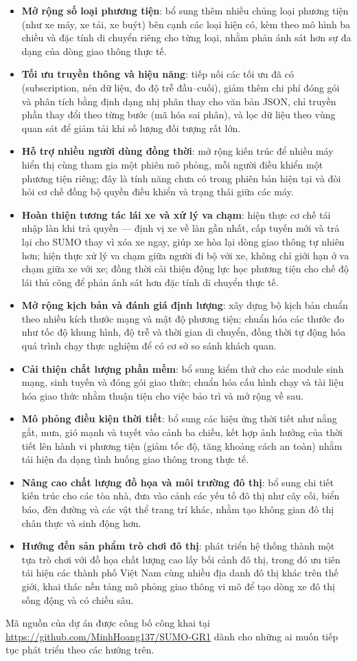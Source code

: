 \documentclass[../DoAn.tex]{subfiles}
\begin{document}
\begin{itemize}[leftmargin=2em]
	\item \textbf{Mở rộng số loại phương tiện}: bổ sung thêm nhiều chủng loại
	phương tiện (như xe máy, xe tải, xe buýt) bên cạnh các loại hiện có, kèm theo
	mô hình ba chiều và đặc tính di chuyển riêng cho từng loại, nhằm phản ánh sát
	hơn sự đa dạng của dòng giao thông thực tế.
	\item \textbf{Tối ưu truyền thông và hiệu năng}: tiếp nối các tối ưu đã có
	(subscription, nén dữ liệu, đo độ trễ đầu--cuối), giảm thêm chi phí đóng gói
	và phân tích bằng định dạng nhị phân thay cho văn bản \gls{JSON}, chỉ truyền
	phần thay đổi theo từng bước (mã hóa sai phân), và lọc dữ liệu theo vùng quan
	sát để giảm tải khi số lượng đối tượng rất lớn.
	\item \textbf{Hỗ trợ nhiều người dùng đồng thời}: mở rộng kiến trúc để nhiều
	máy hiển thị cùng tham gia một phiên mô phỏng, mỗi người điều khiển một phương
	tiện riêng; đây là tính năng chưa có trong phiên bản hiện tại và đòi hỏi cơ
	chế đồng bộ quyền điều khiển và trạng thái giữa các máy.
	\item \textbf{Hoàn thiện tương tác lái xe và xử lý va chạm}: hiện thực cơ
	chế tái nhập làn khi trả quyền --- định vị xe về làn gần nhất, cấp tuyến mới
	và trả lại cho \gls{SUMO} thay vì xóa xe ngay, giúp xe hòa lại dòng giao thông
	tự nhiên hơn; hiện thực xử lý va chạm giữa người đi bộ với xe, không chỉ giới
	hạn ở va chạm giữa xe với xe; đồng thời cải thiện động lực học phương tiện cho
	chế độ lái thủ công để phản ánh sát hơn đặc tính di chuyển thực tế.
	\item \textbf{Mở rộng kịch bản và đánh giá định lượng}: xây dựng bộ kịch bản
	chuẩn theo nhiều kích thước mạng và mật độ phương tiện; chuẩn hóa các thước đo
	như tốc độ khung hình, độ trễ và thời gian di chuyển, đồng thời tự động hóa
	quá trình chạy thực nghiệm để có cơ sở so sánh khách quan.
	\item \textbf{Cải thiện chất lượng phần mềm}: bổ sung kiểm thử cho các module
	sinh mạng, sinh tuyến và đóng gói giao thức; chuẩn hóa cấu hình chạy và tài
	liệu hóa giao thức nhằm thuận tiện cho việc bảo trì và mở rộng về sau.
	\item \textbf{Mô phỏng điều kiện thời tiết}: bổ sung các hiệu ứng thời tiết
	như nắng gắt, mưa, gió mạnh và tuyết vào cảnh ba chiều, kết hợp ảnh hưởng của
	thời tiết lên hành vi phương tiện (giảm tốc độ, tăng khoảng cách an toàn) nhằm
	tái hiện đa dạng tình huống giao thông trong thực tế.
	\item \textbf{Nâng cao chất lượng đồ họa và môi trường đô thị}: bổ sung chi
	tiết kiến trúc cho các tòa nhà, đưa vào cảnh các yếu tố đô thị như cây cối,
	biển báo, đèn đường và các vật thể trang trí khác, nhằm tạo không gian đô thị
	chân thực và sinh động hơn.
	\item \textbf{Hướng đến sản phẩm trò chơi đô thị}: phát triển hệ thống thành
	một tựa trò chơi với đồ họa chất lượng cao lấy bối cảnh đô thị, trong đó ưu
	tiên tái hiện các thành phố Việt Nam cùng nhiều địa danh đô thị khác trên thế
	giới, khai thác nền tảng mô phỏng giao thông vi mô để tạo dòng xe đô thị sống
	động và có chiều sâu.
\end{itemize}

Mã nguồn của dự án được công bố công khai tại
\url{https://github.com/MinhHoang137/SUMO-GR1} dành cho những ai muốn tiếp tục
phát triển theo các hướng trên.
\end{document}
